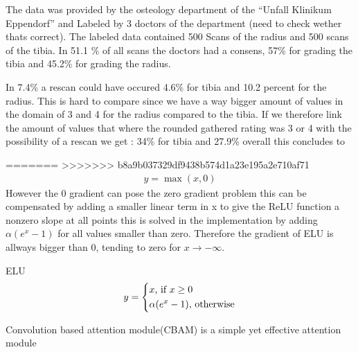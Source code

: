 \documentclass[
a4paper, 
12pt,
grayscalebody, %
abstract=on,
twoside, BCOR10mm, 12pt, DIV13,headinclude, footexclude, final, abstracton, openright
]{ibireprt}
\numberwithin{equation}{chapter}
\numberwithin{table}{chapter}
\numberwithin{figure}{chapter}
\numberwithin{algorithm}{chapter}
\numberwithin{example}{chapter}
\numberwithin{example}{chapter}
\begin{document}
The data was provided by the osteology department of the ``Unfall Klinikum Eppendorf'' and Labeled by 3 doctors of the department (need to check wether thats correct). The labeled data contained 500 Scans of the radius and 500 scans of the tibia. In  51.1 \% of all scans the doctors had a consens, 57\% for grading the tibia and 45.2\% for grading the radius. 

In 7.4\% a rescan could have occured 4.6\% for tibia and 10.2 percent for the radius. This is hard to compare since we have a way bigger amount of values in the domain of 3 and 4 for the radius compared to the tibia. If we therefore link the amount of values that where the rounded gathered rating was 3 or 4 with the possibility of a rescan we get : 34\% for tibia and 27.9\% overall this concludes to  %



=======
>>>>>>> b8a9b037329df9438b574d1a23e195a2e710af71
\begin{align}
	y = \max(x,0)
\end{align}
However the 0 gradient can pose the zero gradient problem this can be compensated by adding a smaller linear term in x to give the ReLU function a nonzero slope at all points this is solved in the implementation by adding $\alpha(e^x-1)$ for all values smaller than zero. Therefore the gradient of ELU is allways bigger than 0, tending to zero for $x \rightarrow - \infty$.

ELU
\begin{align}
	y = 
	\begin{dcases}
		x \text{, if } x \geq 0 \\
		\alpha(e^x-1) \text{, otherwise}
	\end{dcases}
\end{align}


Convolution based attention module(CBAM) is a simple yet effective attention module \cite{Woo2018}
\end{document}
